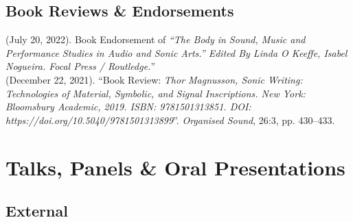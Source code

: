 \documentclass[10pt, a4paper]{article}
\newcommand{\years}[1]{\marginnote{\scriptsize #1}}
\begin{document}
{\subsection*{Book Reviews \& Endorsements}
\noindent

\years{2022}(July 20, 2022). Book Endorsement of \emph{``The Body in Sound, Music and Performance Studies in Audio and Sonic Arts.'' Edited By Linda O Keeffe, Isabel Nogueira. Focal Press / Routledge.}''\\
\years{2021}(December 22, 2021). ``Book Review: \emph{Thor Magnusson, Sonic Writing: Technologies of Material, Symbolic, and Signal Inscriptions. New York: Bloomsbury Academic, 2019. ISBN: 9781501313851. DOI: https://doi.org/10.5040/9781501313899}''. \emph{Organised Sound}, 26:3, pp. 430–433.


\section*{Talks, Panels \& Oral Presentations}

\subsection*{External}
\noindent

}
\end{document}
